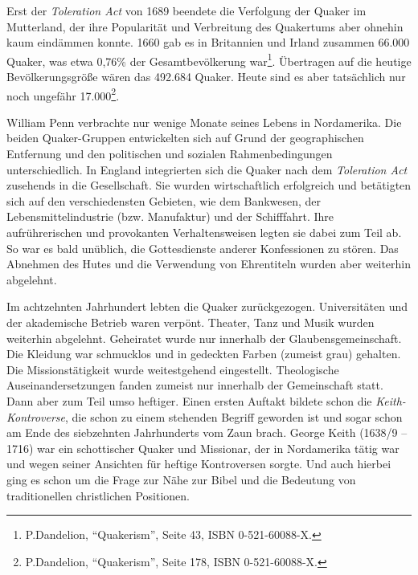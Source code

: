 \medskip

Erst der \textit{Toleration Act} von 1689 beendete die
Verfolgung der Quaker im
Mutterland, der ihre Popularität und Verbreitung des Quakertums aber ohnehin
kaum eindämmen konnte.
 1660 gab
es in Britannien und Irland
zusammen
66.000 Quaker, was etwa 0,76\% der
Gesamtbevölkerung war\footnote{P.Dandelion, "`Quakerism"', Seite 43, ISBN
0-521-60088-X.}. Übertragen auf die heutige Bevölkerungsgröße wären das 492.684
Quaker. Heute sind es aber tatsächlich nur noch ungefähr
17.000\footnote{P.Dandelion, "`Quakerism"', Seite 178, ISBN 0-521-60088-X.}.

\medskip

William Penn verbrachte nur wenige Monate seines Lebens in Nordamerika. Die beiden
Quaker-Gruppen entwickelten sich auf Grund der geographischen Entfernung und den
politischen und sozialen Rahmenbedingungen unterschiedlich. In
England integrierten sich die Quaker nach dem \textit{Toleration Act} zusehends
in die Gesellschaft. Sie wurden wirtschaftlich
erfolgreich und betätigten sich
auf den verschiedensten Gebieten, wie dem Bankwesen, der
Lebensmittelindustrie
(bzw. Manufaktur) und der Schifffahrt. Ihre aufrührerischen und provokanten
Verhaltensweisen legten sie dabei zum Teil ab. So war es bald unüblich, die
Gottesdienste anderer Konfessionen zu stören. Das Abnehmen des Hutes und die
Verwendung von Ehrentiteln wurden aber weiterhin abgelehnt.

\medskip

Im achtzehnten Jahrhundert lebten die Quaker zurückgezogen.
Universitäten und der akademische Betrieb waren verpönt. Theater, Tanz und Musik
wurden weiterhin abgelehnt. Geheiratet wurde nur innerhalb der
Glaubensgemeinschaft. Die Kleidung war schmucklos und in
gedeckten Farben
(zumeist grau) gehalten. Die Missionstätigkeit wurde weitestgehend eingestellt.
Theologische Auseinandersetzungen fanden zumeist nur innerhalb der Gemeinschaft
statt. Dann aber zum Teil umso heftiger. Einen ersten Auftakt bildete schon die
\textit{Keith-Kontroverse}, die schon zu einem
stehenden Begriff geworden ist und sogar schon am Ende des siebzehnten Jahrhunderts
vom Zaun brach. George Keith (1638/9 -- 1716)
war ein schottischer
Quaker und Missionar, der in
Nordamerika tätig war und wegen seiner Ansichten für heftige Kontroversen
sorgte. Und auch hierbei ging es schon um die Frage zur Nähe zur Bibel und die
Bedeutung von traditionellen christlichen Positionen.

